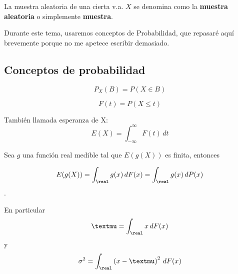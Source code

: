 \documentclass{apuntes}
\begin{document}
La muestra aleatoria de una cierta v.a. $X$ se denomina como la \textbf{muestra aleatoria} o simplemente \textbf{muestra}.

Durante este tema, usaremos conceptos de Probabilidad, que repasaré aquí brevemente porque no me apetece escribir demasiado.

\subsection{Conceptos de probabilidad}

\begin{defn}
\[ P_X(B) = P(X \in B) \]
\end{defn}

\begin{defn}
\[F(t) = P(X ≤ t) \]
\end{defn}

\begin{defn} También llamada esperanza de X:
\[ E(X) = \int_{-\infty}^\infty F(t)\,dt \]
\end{defn}

\begin{theorem} Sea $g$ una función real medible tal que $E(g(X))$ es finita, entonces 

\[ E(g(X)) = \int_\real g(x) \, dF(x) = \int_\real g(x)\, dP(x) \]. 

En particular \[ µ =\int_\real x\, dF(x)  \] y \[ \sigma^2 = \int_\real \left(x - µ\right)^2 \, dF(x) \]

\end{theorem}





\newpage
\printindex
\end{document}
